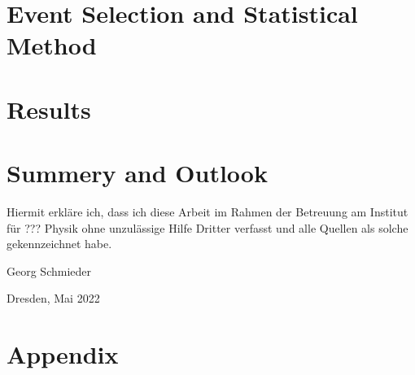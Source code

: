 \chapter{Event Selection and Statistical Method}


\chapter{Results}


\chapter{Summery and Outlook}



\newpage
\nocite{*}
\printbibliography

\listoffigures
\listoftables

\clearpage
\thispagestyle{empty}
\vspace*{1.5em}

Hiermit erkläre ich, dass ich diese Arbeit im Rahmen der Betreuung am Institut
für ??? Physik ohne unzulässige Hilfe Dritter verfasst und alle Quellen als solche gekennzeichnet habe.

\vspace*{45em}

Georg Schmieder \par
Dresden, Mai 2022

\chapter{Appendix}
\label{sec:appendix}
